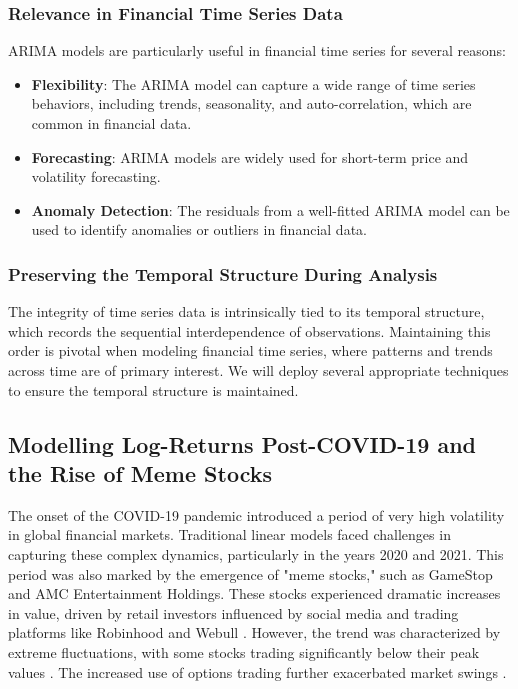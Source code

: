 \documentclass[12pt, twoside,hidelinks]{article}
\theoremstyle{definition}
\numberwithin{equation}{section}
\begin{document}
\subsubsection*{Relevance in Financial Time Series Data}

ARIMA models are particularly useful in financial time series for several reasons:

\begin{itemize}
    \item \textbf{Flexibility}: The ARIMA model can capture a wide range of time series behaviors, including trends, seasonality, and auto-correlation, which are common in financial data.
    \item \textbf{Forecasting}: ARIMA models are widely used for short-term price and volatility forecasting.
    \item \textbf{Anomaly Detection}: The residuals from a well-fitted ARIMA model can be used to identify anomalies or outliers in financial data.
\end{itemize}


\subsubsection*{Preserving the Temporal Structure During Analysis}
The integrity of time series data is intrinsically tied to its temporal structure, which records the sequential interdependence of observations. Maintaining this order is pivotal when modeling financial time series, where patterns and trends across time are of primary interest. We will deploy several appropriate techniques to ensure the temporal structure is maintained.



\subsection{Modelling Log-Returns Post-COVID-19 and the Rise of Meme Stocks}

The onset of the COVID-19 pandemic introduced a period of very high volatility in global financial markets. Traditional linear models faced challenges in capturing these complex dynamics, particularly in the years 2020 and 2021. This period was also marked by the emergence of "meme stocks," such as GameStop and AMC Entertainment Holdings. These stocks experienced dramatic increases in value, driven by retail investors influenced by social media and trading platforms like Robinhood and Webull \cite{reuters2021meme}. However, the trend was characterized by extreme fluctuations, with some stocks trading significantly below their peak values \cite{reuters2021meme2}. The increased use of options trading further exacerbated market swings \cite{reuters2021options}.
\newline
    
\end{document}
